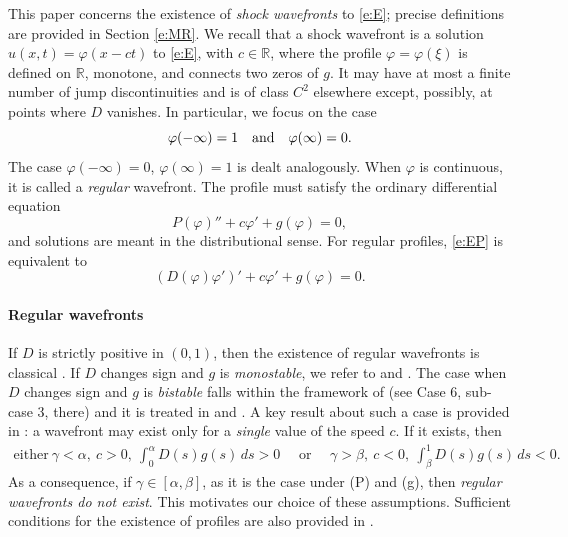 \documentclass[11pt,a4paper]{article}
\newcommand{\R}{\mathbb R}
\renewcommand{\phi}{\varphi}
\begin{document}
This paper concerns the existence of {\em shock wavefronts} to \eqref{e:E}; precise definitions are provided in Section \ref{e:MR}. 
We recall that a shock wavefront is a solution $u(x,t)=\phi(x-ct)$ to \eqref{e:E}, with $c\in\R$, where the profile $\phi=\phi(\xi)$ is defined on $\R$, monotone, and connects two zeros of $g$. It may have at most a finite number of jump discontinuities and is of class $C^2$ elsewhere except, possibly, at points  where $D$ vanishes. In particular, we focus on the case
\begin{equation} \label{e:phi-limits}
\phi(-\infty)=1\quad \hbox{and}\quad \phi(\infty)=0.
\end{equation}
The case $\phi(-\infty)=0$, $\phi(\infty)=1$ is dealt analogously.
When $\phi$ is continuous, it is called a \emph{regular} wavefront.
The profile must satisfy the ordinary differential equation
\begin{equation}\label{e:EP}
P(\phi)''+c\phi'+g(\phi)=0,
\end{equation}
and solutions are meant in the distributional sense. For regular profiles, \eqref{e:EP} is equivalent to
\begin{equation}\label{e:ED}
\left(D(\phi)\phi'\right)'+c\phi'+g(\phi)=0.
\end{equation}

\paragraph{Regular wavefronts} If $D$ is strictly positive in $(0,1)$, then the existence of regular wavefronts is classical \cite{Fife, GK}. If $D$ changes sign and $g$ is \emph{monostable}, we refer to \cite{BCM2} and \cite{Ferracuti-Marcelli-Papalini}. The case when $D$ changes sign and $g$ is  {\em bistable} falls within  the framework of \cite{JBMS} (see Case 6, sub-case 3, there) and it is treated in  \cite{BCM3} and \cite{Kuzmin-Ruggerini}. 
A key result about such a case is provided in \cite{Kuzmin-Ruggerini}: a wavefront may exist only for a {\em single} value of the speed $c$. If it exists, then
\begin{align}\label{e:KR-cn1}
\text{either}\  \gamma<\alpha, \ c>0,\ \int_0^\alpha D(s)g(s)\, ds>0 \quad \text{ or }\quad \gamma>\beta, \ c<0,\ \int_\beta^1 D(s)g(s)\, ds<0.
\end{align}
As a consequence, if $\gamma\in[\alpha,\beta]$, as it is the case under (P) and (g), then {\em regular wavefronts do not exist}. This motivates our choice of these assumptions. Sufficient conditions for the existence of profiles are also provided in \cite{Kuzmin-Ruggerini}.
\end{document}
